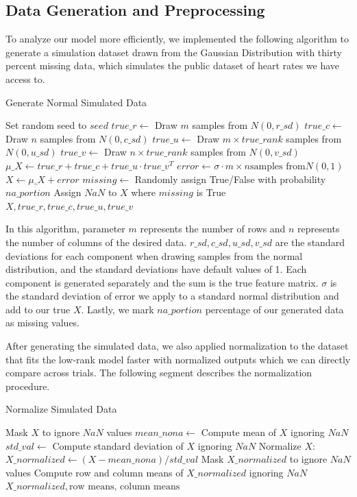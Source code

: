 \documentclass{article}
\begin{document}
\subsection{Data Generation and Preprocessing}
To analyze our model more efficiently, we implemented the following algorithm to generate a simulation dataset drawn from the Gaussian Distribution with thirty percent missing data, which simulates the public dataset of heart rates we have access to.
\begin{algorithm}[H]
\caption{Generate Normal Simulated Data}
\begin{algorithmic}[1]
    \State Set random seed to $seed$
    \State $true\_r \gets$ Draw $m$ samples from $N(0, r\_sd)$
    \State $true\_c \gets$ Draw $n$ samples from $N(0, c\_sd)$
    \State $true\_u \gets$ Draw $m \times true\_rank$ samples from $N(0, u\_sd)$
    \State $true\_v \gets$ Draw $n \times true\_rank$ samples from $N(0, v\_sd)$
    \State $\mu\_X \gets true\_r + true\_c + true\_u \cdot true\_v^T$
    \State $error \gets \sigma \cdot m \times n \text{samples from} N(0, 1)$
    \State $X \gets \mu\_X + error$
    \State $missing \gets$ Randomly assign True/False with probability $na\_portion$
    \State Assign $NaN$ to $X$ where $missing$ is True
    \State \Return $X, true\_r, true\_c, true\_u, true\_v$
\EndProcedure
\end{algorithmic}
\end{algorithm}

In this algorithm, parameter $m$ represents the number of rows and $n$ represents the number of columns of the desired data. $r\_sd, c\_sd, u\_sd, v\_sd$ are the standard deviations for each component when drawing samples from the normal distribution, and the standard deviations have default values of 1. Each component is generated separately and the sum is the true feature matrix. $\sigma$ is the standard deviation of error we apply to a standard normal distribution and add to our true $X$. Lastly, we mark $na\_portion$ percentage of our generated data as missing values.

After generating the simulated data, we also applied normalization to the dataset that fits the low-rank model faster with normalized outputs which we can directly compare across trials. The following segment describes the normalization procedure.
\begin{algorithm}
\caption{Normalize Simulated Data}
\begin{algorithmic}[1]
    \State Mask $X$ to ignore $NaN$ values
    \State $mean\_nona \gets$ Compute mean of $X$ ignoring $NaN$
    \State $std\_val \gets$ Compute standard deviation of $X$ ignoring $NaN$
    \State Normalize $X$: $X\_normalized \gets (X - mean\_nona) / std\_val$
    \State Mask $X\_normalized$ to ignore $NaN$ values
    \State Compute row and column means of $X\_normalized$ ignoring $NaN$
    \State \Return $X\_normalized, \text{row means, column means}$
\EndProcedure
\end{algorithmic}
\end{algorithm}
\end{document}
